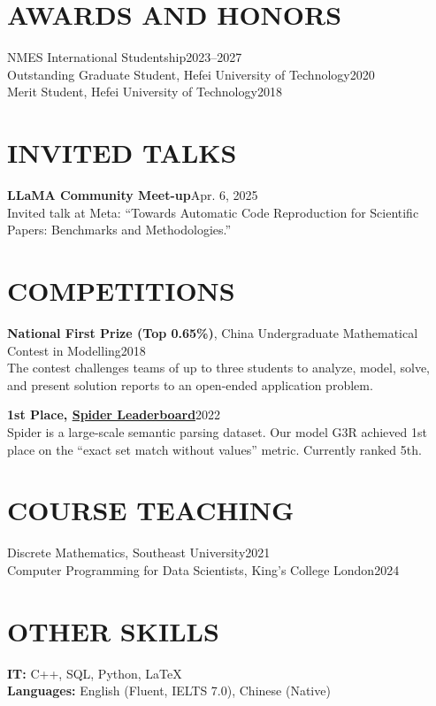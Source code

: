 \documentclass[UTF8,11pt,a4paper,fontset=none]{ctexart}
\begin{document}
\section*{AWARDS AND HONORS}
NMES International Studentship\hfill 2023--2027\\
Outstanding Graduate Student, Hefei University of Technology\hfill 2020\\
Merit Student, Hefei University of Technology\hfill 2018

\section*{INVITED TALKS}
\textbf{LLaMA Community Meet-up}\hfill Apr. 6, 2025\\
Invited talk at Meta: “Towards Automatic Code Reproduction for Scientific Papers: Benchmarks and Methodologies.”

\section*{COMPETITIONS}
\textbf{National First Prize (Top 0.65\%)}, China Undergraduate Mathematical Contest in Modelling\hfill 2018\\
The contest challenges teams of up to three students to analyze, model, solve, and present solution reports to an open-ended application problem.

\vspace{0.25em}
\textbf{1st Place, \href{https://yale-lily.github.io/spider}{Spider Leaderboard}}\hfill 2022\\
Spider is a large-scale semantic parsing dataset. Our model G3R achieved 1st place on the “exact set match without values” metric. Currently ranked 5th.

\section*{COURSE TEACHING}
Discrete Mathematics, Southeast University\hfill 2021\\
Computer Programming for Data Scientists, King’s College London\hfill 2024

\section*{OTHER SKILLS}
\textbf{IT:} C++, SQL, Python, LaTeX\\
\textbf{Languages:} English (Fluent, IELTS 7.0), Chinese (Native)
\end{document}
